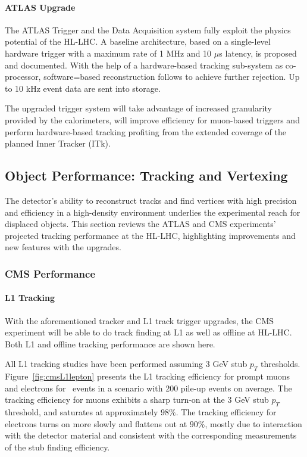 \paragraph{ATLAS Upgrade}
The ATLAS Trigger and the Data Acquisition system  fully exploit the physics potential of the HL-LHC.
A baseline architecture, based on a single-level hardware trigger with a
maximum rate of 1 MHz and 10 $\mu$s latency, is proposed and documented. With
the help of a hardware-based tracking sub-system as co-processor, software=based
reconstruction follows to achieve further rejection. Up to 10 kHz event
data are sent into storage.

The upgraded trigger system will take advantage of increased granularity provided by the
calorimeters, will improve efficiency for muon-based triggers and perform hardware-based
tracking profiting from the extended coverage of the planned Inner Tracker (ITk). 



\subsection{Object Performance: Tracking and Vertexing} \label{sec:upgradeobject}


The detector's ability to reconstruct tracks and find vertices with high precision and efficiency in a high-density environment underlies the experimental reach for displaced objects. 
This section reviews the ATLAS and CMS experiments' projected tracking performance at the HL-LHC, highlighting improvements and new features with the upgrades.

\subsubsection{CMS Performance} 

\paragraph{L1 Tracking} 

With the aforementioned tracker and L1 track trigger upgrades, the CMS experiment will be able to do track finding at L1 as well as offline at HL-LHC. Both L1 and offline tracking performance are shown here. 

All L1 tracking studies have been performed assuming 3 GeV stub $p_T$ thresholds.
Figure~\ref{fig:cmsL1lepton} presents the L1 tracking efficiency for prompt muons and electrons for \ttbar~events in a scenario with 200 pile-up events on average. 
The tracking efficiency for muons exhibits a sharp turn-on at the 3 GeV stub $p_T$ threshold, and saturates at approximately $98\%$. 
The tracking efficiency for electrons turns on more slowly and flattens out at $90\%$, mostly due to interaction with the detector material and consistent with the corresponding measurements of the stub finding efficiency. 

